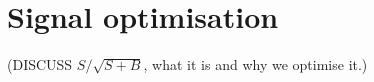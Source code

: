 \documentclass[12pt]{thesis}  %
\begin{document}
\pagebreak

\chapter{Signal optimisation}

(DISCUSS $S/\sqrt{S+B}$, what it is and why we optimise it.)
\end{document}
